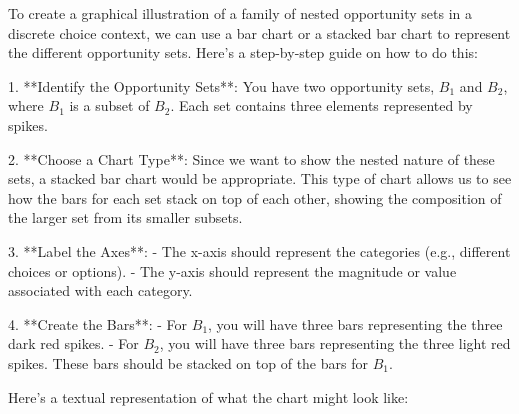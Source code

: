 To create a graphical illustration of a family of nested opportunity sets in a discrete choice context, we can use a bar chart or a stacked bar chart to represent the different opportunity sets. Here's a step-by-step guide on how to do this:

1. **Identify the Opportunity Sets**: You have two opportunity sets, \( B_{1} \) and \( B_{2} \), where \( B_{1} \) is a subset of \( B_{2} \). Each set contains three elements represented by spikes.

2. **Choose a Chart Type**: Since we want to show the nested nature of these sets, a stacked bar chart would be appropriate. This type of chart allows us to see how the bars for each set stack on top of each other, showing the composition of the larger set from its smaller subsets.

3. **Label the Axes**:
   - The x-axis should represent the categories (e.g., different choices or options).
   - The y-axis should represent the magnitude or value associated with each category.

4. **Create the Bars**:
   - For \( B_{1} \), you will have three bars representing the three dark red spikes.
   - For \( B_{2} \), you will have three bars representing the three light red spikes. These bars should be stacked on top of the bars for \( B_{1} \).

Here’s a textual representation of what the chart might look like:

